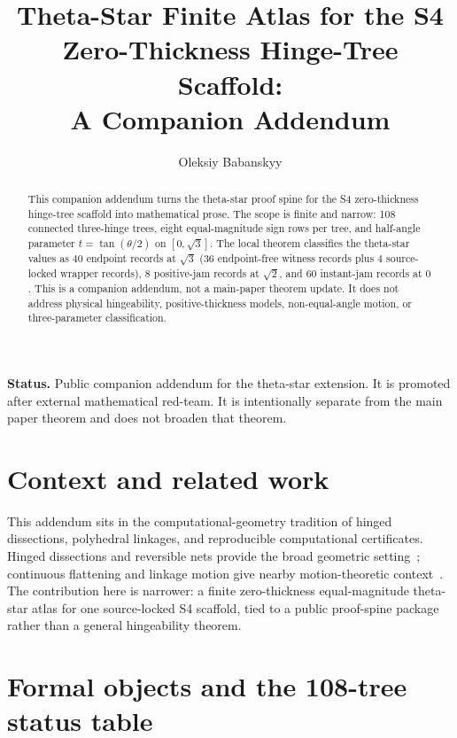 \documentclass[11pt,a4paper]{article}
\title{Theta-Star Finite Atlas for the S4 Zero-Thickness Hinge-Tree Scaffold:\\
A Companion Addendum}
\author{Oleksiy Babanskyy}
\date{}
\theoremstyle{definition}
\theoremstyle{remark}
\begin{document}
\maketitle

\begin{abstract}
This companion addendum turns the theta-star proof spine for the S4 zero-thickness
hinge-tree scaffold into mathematical prose.  The scope is finite and narrow:
108 connected three-hinge trees, eight equal-magnitude sign rows per tree, and
half-angle parameter \(t=\tan(\theta/2)\) on \([0,\sqrt{3}]\).  The local theorem
classifies the theta-star values as 40 endpoint records at \(\sqrt{3}\)
(36 endpoint-free witness records plus 4 source-locked wrapper records), 8
positive-jam records at \(\sqrt{2}\), and 60 instant-jam records at \(0\).  This is a companion addendum, not a main-paper theorem update.  It does not address physical
hingeability, positive-thickness models, non-equal-angle motion, or
three-parameter classification.
\end{abstract}

\noindent\textbf{Status.} Public companion addendum for the theta-star extension.  It is promoted after external mathematical red-team. It is intentionally separate from the main paper theorem and does not broaden that theorem.

\section*{Context and related work}
This addendum sits in the computational-geometry tradition of hinged dissections, polyhedral linkages, and reproducible computational certificates.  Hinged dissections and reversible nets provide the broad geometric setting~\cite{abbott2007hinged,akiyama2018polyhedral,akiyama2016reversible,demaine2007gfalop}; continuous flattening and linkage motion give nearby motion-theoretic context~\cite{demaine2024continuous,demaine2001vertex}.  The contribution here is narrower: a finite zero-thickness equal-magnitude theta-star atlas for one source-locked S4 scaffold, tied to a public proof-spine package rather than a general hingeability theorem.




\section{Formal objects and the 108-tree status table}
\end{document}
